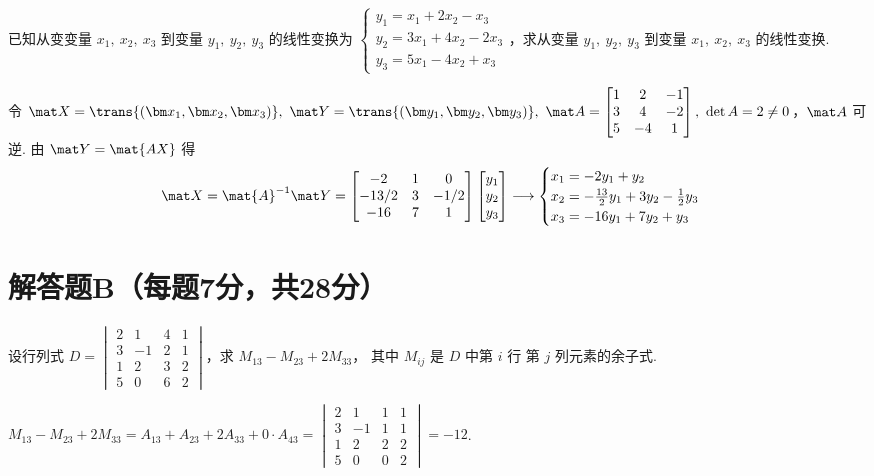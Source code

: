 \begin{problem}
  已知从变变量 $x_1,~ x_2,~ x_3$ 到变量 $y_1,~ y_2,~ y_3$ 的线性变换为
  $\begin{cases}
    y_1 =  x_1 + 2x_2 - x_3\\
    y_2 = 3x_1 + 4x_2 - 2x_3\\
    y_3 = 5x_1 - 4x_2 + x_3
  \end{cases}$，求从变量 $y_1,~ y_2,~ y_3$ 到变量
  $x_1,~ x_2,~ x_3$ 的线性变换.
\end{problem}
\scratch
\begin{solution}
  令 $\mat X = \trans{(\bm x_1, \bm x_2, \bm x_3)},~
  \mat Y = \trans{(\bm y_1, \bm y_2, \bm y_3)},~
  \mat A =
  \begin{bmatrix}
    1 & 2 & -1\\
    3 & 4 & -2\\
    5 & -4& 1
  \end{bmatrix},~ \det A = 2 \neq 0$，$\mat A$ 可逆.
  由 $\mat Y = \mat{AX}$ 得
  \[
    \mat X = \mat{A}^{-1}\mat Y =
    \begin{bmatrix}
      -2    & 1 & 0\\
      -13/2 & 3 & -1/2\\
      -16   & 7 & 1
    \end{bmatrix}
    \begin{bmatrix}
      y_1\\ y_2\\ y_3
    \end{bmatrix} \longrightarrow
    \begin{cases}
      x_1 = -2y_1 + y_2\\
      x_2 = -\frac{13}{2}y_1 + 3y_2 - \frac12y_3\\
      x_3 = -16y_1 + 7y_2 + y_3
    \end{cases}
  \]
\end{solution}

\section{解答题B（每题7分，共28分）}

\begin{problem}[本题7分]
  设行列式 $D =
  \begin{vmatrix}
    2 & 1  & 4 & 1\\
    3 & -1 & 2 & 1\\
    1 & 2  & 3 & 2\\
    5 & 0  & 6 & 2
  \end{vmatrix}$，求 $M_{13} - M_{23} + 2M_{33}$，
  其中 $M_{ij}$ 是 $D$ 中第 $i$ 行 第 $j$ 列元素的余子式.
\end{problem}
\scratch[2ex]
\begin{solution}
  $ M_{13} - M_{23} + 2M_{33} = A_{13} + A_{23} + 2A_{33} + 0 \cdot A_{43} =
    \begin{vmatrix}
      2 &  1 & 1 & 1\\
      3 & -1 & 1 & 1\\
      1 & 2  & 2 & 2\\
      5 & 0  & 0 & 2
    \end{vmatrix} = -12$.
\end{solution}

